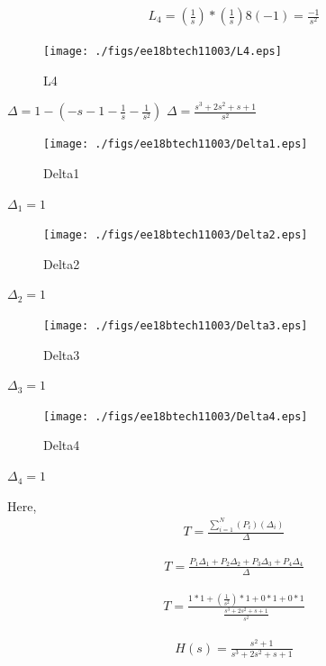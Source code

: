 \begin{enumerate}[label=\thesection.\arabic*.,ref=\thesection.\theenumi]
\begin{align}
L_4=(\frac{1}{s})*(\frac{1}{s})8(-1)=\frac{-1}{s^2}
\end{align}

\begin{figure}[!ht]
\centering
\texttt{[image: ./figs/ee18btech11003/L4.eps]}
\caption{L4}
\label{fig:sec_order}
\end{figure}


$\Delta = 1-(-s-1-\frac{1}{s}-\frac{1}{s^2})$
$\Delta = \frac{s^3+2s^2+s+1}{s^2}$

\begin{figure}[!ht]
\centering
\texttt{[image: ./figs/ee18btech11003/Delta1.eps]}
\caption{Delta1}
\label{fig:sec_order}
\end{figure}


$\Delta_1 = 1$

\begin{figure}[!ht]
\centering
\texttt{[image: ./figs/ee18btech11003/Delta2.eps]}
\caption{Delta2}
\label{fig:sec_order}
\end{figure}


$\Delta_2 = 1$

\begin{figure}[!ht]
\centering
\texttt{[image: ./figs/ee18btech11003/Delta3.eps]}
\caption{Delta3}
\label{fig:sec_order}
\end{figure}


$\Delta_3 = 1$

\begin{figure}[!ht]
\centering
\texttt{[image: ./figs/ee18btech11003/Delta4.eps]}
\caption{Delta4}
\label{fig:sec_order}
\end{figure}

$\Delta_4 = 1$

Here, 
\begin{align}
T=\frac{\sum_{i=1}^{N}(P_i)(\Delta_i)}{\Delta}
\end{align}

\begin{align}
T=\frac{P_1 \Delta_1+P_2 \Delta_2+P_3 \Delta_3+P_4 \Delta_4}{\Delta}
\end{align}

\begin{align}
T=\frac{1*1 +(\frac{1}{s^2})*1 + 0*1 + 0*1 }{\frac{s^3+2s^2+s+1}{s^2}}
\end{align}

\begin{align}
H(s)=\frac{s^2+1}{s^3+2s^2+s+1}
\end{align}
\renewcommand{\thefigure}{\theenumi}

\end{enumerate}
